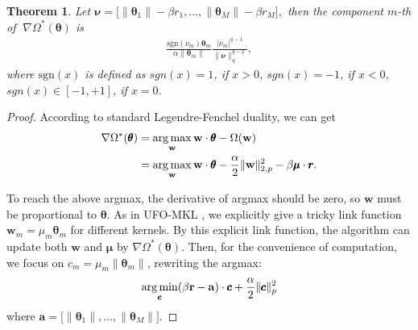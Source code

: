 \documentclass{article}
\newcommand{\argmax}{\operatornamewithlimits{arg\,max}}
\newcommand{\argmin}{\operatornamewithlimits{arg\,min}}
\newtheorem{theorem}{Theorem}
\begin{document}
 \begin{theorem}
\label{theorem-fenchel-dual}
Let
$
    \bm \nu=\Big[\|\pmb{\theta}_1\|-\beta r_1,\ldots,
    \|\pmb{\theta}_M\|-\beta r_M\Big],
$
then the component $m$-th of $\;\nabla\Omega^\ast(\pmb{\theta})$ is
\begin{align*}
\frac{\mathrm{sgn}(\nu_m) \pmb{\theta}_m}{\alpha\|\pmb{\theta}_m\|}
       \frac{|\nu_m|^{q-1}}{\|\bm \nu\|_q^{q-2}},
\end{align*}
where $\mathrm{sgn}(x)$ is defined as
$sgn(x)=1$, if $x>0$, $sgn(x)=-1$, if $x<0$,
$sgn(x)\in[-1,+1]$, if $x=0$.
\end{theorem}

\begin{proof}
According to standard Legendre-Fenchel duality, we can get
\begin{align*}
\nabla\Omega^*(\pmb{\theta})&=\argmax\limits_{\mathbf w} \mathbf w \cdot \pmb{\theta} - \Omega(\mathbf w)\\
&=\argmax\limits_{\mathbf w} \mathbf w \cdot \pmb{\theta}
-\frac{\alpha}{2}\|\mathbf w\|_{2,p}^2
-\beta\pmb{\mu}\cdot\pmb{r}.
\end{align*}

To reach the above argmax, the derivative of argmax should be zero,
so $\mathbf w$ must be proportional to $\pmb{\theta}$.
As in UFO-MKL \cite{OrabonaL11}, we explicitly give a tricky link function
$\mathbf w_m=\mu_m\pmb{\theta}_m$ for different kernels.
By this explicit link function, the algorithm can update both $\mathbf w$ and $\pmb \mu$ by $\nabla\Omega^\ast(\pmb{\theta})$.
Then, for the convenience of computation, we focus on $c_m=\mu_m\|\pmb{\theta}_m\|$, rewriting the argmax:
\begin{align}
    \label{lp-regularization}
    \argmin \limits_{\pmb{c}} (\beta\mathbf{r} - \mathbf{a})\cdot\pmb{c}+\frac{\alpha}{2}\|\pmb{c}\|_p^2
\end{align}
where $\mathbf{a}=\Big[\|\pmb{\theta}_1\|,\ldots, \|\pmb{\theta}_M\|\Big]$.


\end{proof}
\end{document}
